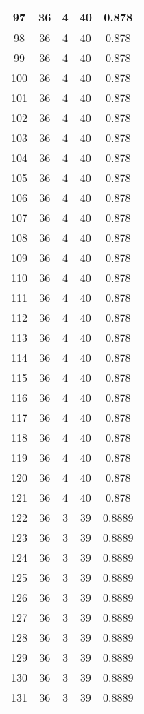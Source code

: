 \documentclass[letterpaper, 12pt]{article}
\begin{document}
\begin{longtable}{|c|c|c|c|c|}
\hline
97 & 36 & 4 & 40 & 0.878 \\
\hline
98 & 36 & 4 & 40 & 0.878 \\
\hline
99 & 36 & 4 & 40 & 0.878 \\
\hline
100 & 36 & 4 & 40 & 0.878 \\
\hline
101 & 36 & 4 & 40 & 0.878 \\
\hline
102 & 36 & 4 & 40 & 0.878 \\
\hline
103 & 36 & 4 & 40 & 0.878 \\
\hline
104 & 36 & 4 & 40 & 0.878 \\
\hline
105 & 36 & 4 & 40 & 0.878 \\
\hline
106 & 36 & 4 & 40 & 0.878 \\
\hline
107 & 36 & 4 & 40 & 0.878 \\
\hline
108 & 36 & 4 & 40 & 0.878 \\
\hline
109 & 36 & 4 & 40 & 0.878 \\
\hline
110 & 36 & 4 & 40 & 0.878 \\
\hline
111 & 36 & 4 & 40 & 0.878 \\
\hline
112 & 36 & 4 & 40 & 0.878 \\
\hline
113 & 36 & 4 & 40 & 0.878 \\
\hline
114 & 36 & 4 & 40 & 0.878 \\
\hline
115 & 36 & 4 & 40 & 0.878 \\
\hline
116 & 36 & 4 & 40 & 0.878 \\
\hline
117 & 36 & 4 & 40 & 0.878 \\
\hline
118 & 36 & 4 & 40 & 0.878 \\
\hline
119 & 36 & 4 & 40 & 0.878 \\
\hline
120 & 36 & 4 & 40 & 0.878 \\
\hline
121 & 36 & 4 & 40 & 0.878 \\
\hline
122 & 36 & 3 & 39 & 0.8889 \\
\hline
123 & 36 & 3 & 39 & 0.8889 \\
\hline
124 & 36 & 3 & 39 & 0.8889 \\
\hline
125 & 36 & 3 & 39 & 0.8889 \\
\hline
126 & 36 & 3 & 39 & 0.8889 \\
\hline
127 & 36 & 3 & 39 & 0.8889 \\
\hline
128 & 36 & 3 & 39 & 0.8889 \\
\hline
129 & 36 & 3 & 39 & 0.8889 \\
\hline
130 & 36 & 3 & 39 & 0.8889 \\
\hline
131 & 36 & 3 & 39 & 0.8889 \\

\end{longtable}
\end{document}
